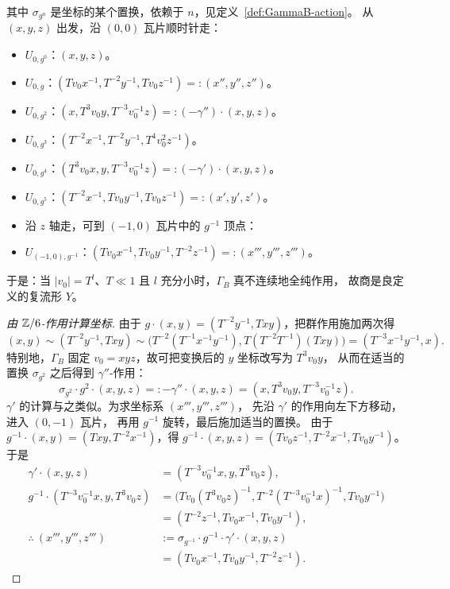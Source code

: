 其中 $\sigma_{g^n}$ 是坐标的某个置换，依赖于 $n$，见定义~\ref{def:GammaB-action}。
从 $(x,y,z)$ 出发，沿 $(0,0)$ 瓦片顺时针走：
\begin{itemize}[leftmargin=2.2em,itemsep=0.25em]
\item $U_{0,g^0}$：$(x,y,z)$。
\item $U_{0,g}$：$(Tv_0x^{-1},T^{-2}y^{-1},Tv_0z^{-1})=:(x'',y'',z'')$。
\item $U_{0,g^2}$：$(x,T^3v_0y,T^{-3}v_0^{-1}z)=:(-\gamma'')\cdot(x,y,z)$。
\item $U_{0,g^3}$：$(T^{-2}x^{-1},T^{-2}y^{-1},T^4v_0^2z^{-1})$。
\item $U_{0,g^4}$：$(T^3v_0x,y,T^{-3}v_0^{-1}z)=:(-\gamma')\cdot(x,y,z)$。
\item $U_{0,g^5}$：$(T^{-2}x^{-1},Tv_0y^{-1},Tv_0z^{-1})=:(x',y',z')$。
\item 沿 $z$ 轴走，可到 $(-1,0)$ 瓦片中的 $g^{-1}$ 顶点：
\item $U_{(-1,0),g^{-1}}$：$(Tv_0x^{-1},Tv_0y^{-1},T^{-2}z^{-1})=:(x''',y''',z''')$。
\end{itemize}

于是：当 $|v_0|=T^l$、$T\ll1$ 且 $l$ 充分小时，$\Gamma_B$ 真不连续地全纯作用，
故商是良定义的复流形 $Y$。

\begin{proof}[{由 $\mathbb{Z}/6$-作用计算坐标}]
由于 $g\cdot(x,y)=(T^{-2}y^{-1},Txy)$，把群作用施加两次得
\[
(x,y)\sim(T^{-2}y^{-1},Txy)\sim
\bigl(T^{-2}(T^{-1}x^{-1}y^{-1}),T(T^{-2}T^{-1})(Txy)\bigr)
=(T^{-3}x^{-1}y^{-1},x).
\]
特别地，$\Gamma_B$ 固定 $v_0=xyz$，故可把变换后的 $y$ 坐标改写为 $T^3v_0y$，
从而在适当的置换 $\sigma_{g^2}$ 之后得到 $\gamma''$-作用：
\[
\sigma_{g^2}\cdot g^2\cdot(x,y,z)=:-\gamma''\cdot(x,y,z)
=(x,T^3v_0y,T^{-3}v_0^{-1}z).
\]
$\gamma'$ 的计算与之类似。为求坐标系 $(x''',y''',z''')$，
先沿 $\gamma'$ 的作用向左下方移动，进入 $(0,-1)$ 瓦片，
再用 $g^{-1}$ 旋转，最后施加适当的置换。
由于 $g^{-1}\cdot(x,y)=(Txy,T^{-2}x^{-1})$，得
$g^{-1}\cdot(x,y,z)=(Tv_0z^{-1},T^{-2}x^{-1},Tv_0y^{-1})$。于是
\begin{align*}
\gamma'\cdot(x,y,z)&=(T^{-3}v_0^{-1}x,y,T^3v_0z),\\
g^{-1}\cdot(T^{-3}v_0^{-1}x,y,T^3v_0z)
&=\bigl(Tv_0(T^3v_0z)^{-1},T^{-2}(T^{-3}v_0^{-1}x)^{-1},Tv_0y^{-1}\bigr)\\
&=(T^{-2}z^{-1},Tv_0x^{-1},Tv_0y^{-1}),\\
\therefore\ (x''',y''',z''')
&:=\sigma_{g^{-1}}\cdot g^{-1}\cdot\gamma'\cdot(x,y,z)\\
&=(Tv_0x^{-1},Tv_0y^{-1},T^{-2}z^{-1}).
\end{align*}
\end{proof}

